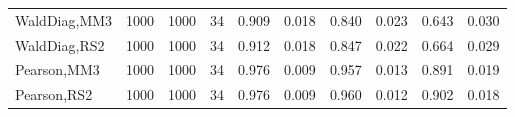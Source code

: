 \documentclass[
]{article}
\begin{document}
\begin{table}[H]
{\begin{tabular}[t]{lrrrrrrlrr}
\hspace{1em}WaldDiag,MM3 & 1000 & 1000 & 34 & 0.909 & 0.018 & 0.840 & 0.023 & 0.643 & 0.030\\
\hspace{1em}WaldDiag,RS2 & 1000 & 1000 & 34 & 0.912 & 0.018 & 0.847 & 0.022 & 0.664 & 0.029\\
\hspace{1em}Pearson,MM3 & 1000 & 1000 & 34 & 0.976 & 0.009 & 0.957 & 0.013 & 0.891 & 0.019\\
\hspace{1em}Pearson,RS2 & 1000 & 1000 & 34 & 0.976 & 0.009 & 0.960 & 0.012 & 0.902 & 0.018\\
\bottomrule
\end{tabular}}
\endgroup{}
\end{table}
\end{document}
